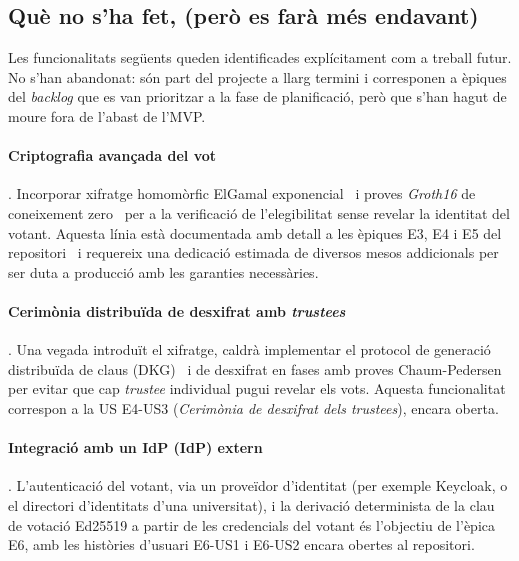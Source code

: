 \subsection{Què no s'ha fet, (però es farà més endavant)}
\label{subsec:que-no-s'ha-fet-(pero-es-fara-mes-endavant)}

Les funcionalitats següents queden identificades explícitament com a treball futur.
No s'han abandonat: són part del projecte a llarg termini i corresponen a èpiques del \emph{backlog} que es van
prioritzar a la fase de planificació, però que s'han hagut de moure fora de l'abast de l'\ac{MVP}.

\paragraph{Criptografia avançada del vot}.
Incorporar xifratge homomòrfic ElGamal exponencial~\cite{elgamal1985public,adida2008helios} i proves \emph{Groth16} de coneixement
zero~\cite{goldwasser1989knowledge,groth2016size} per a la verificació de l'elegibilitat sense revelar la identitat del votant.
Aquesta línia està documentada amb detall a les èpiques E3, E4 i E5 del repositori~\cite{demochainrepo} i requereix una
dedicació estimada de diversos mesos addicionals per ser duta a producció amb les garanties necessàries.

\paragraph{Cerimònia distribuïda de desxifrat amb \emph{trustees}}.
Una vegada introduït el xifratge, caldrà implementar el protocol de generació distribuïda de claus (DKG)~\cite{gennaro1999dkg} i de desxifrat
en fases amb proves Chaum-Pedersen~\cite{chaum1992wallet} per evitar que cap \emph{trustee} individual pugui revelar els vots.
Aquesta funcionalitat correspon a la \ac{US} E4-\ac{US}3 (\emph{Cerimònia de desxifrat dels trustees}), encara oberta.

\paragraph{Integració amb un \acl{IdP} (\ac{IdP}) extern}.
L'autenticació del votant, via un proveïdor d'identitat (per exemple Keycloak, o el directori d'identitats d'una
universitat), i la derivació determinista de la clau de votació Ed25519 a partir de les credencials del votant és
l'objectiu de l'èpica E6, amb les històries d'usuari E6-\ac{US}1 i E6-\ac{US}2 encara obertes al repositori.


